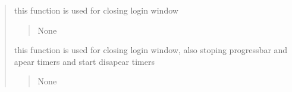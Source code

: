 \documentclass[letterpaper,10pt,english]{sphinxmanual}
\begin{document}
\begin{quote}
\begin{savenotes}
\begin{fulllineitems}
\begin{savenotes}
\begin{fulllineitems}
\end{fulllineitems}\end{savenotes}


\begin{savenotes}\begin{fulllineitems}
\label{\detokenize{setting/notif_UI:oxin.notif_UI.UI_main_window.check_appear_done}}
\pysigstartsignatures
{}
\pysigstopsignatures
\end{fulllineitems}\end{savenotes}


\begin{savenotes}\begin{fulllineitems}
\label{\detokenize{setting/notif_UI:oxin.notif_UI.UI_main_window.close_win}}
\pysigstartsignatures
{}
\pysigstopsignatures
\sphinxAtStartPar
this function is used for closing login window
\begin{quote}\begin{description}
\sphinxAtStartPar
None

\end{description}\end{quote}

\end{fulllineitems}\end{savenotes}


\begin{savenotes}\begin{fulllineitems}
\label{\detokenize{setting/notif_UI:oxin.notif_UI.UI_main_window.close_win_2}}
\pysigstartsignatures
{}
\pysigstopsignatures
\sphinxAtStartPar
this function is used for closing login window, also stoping progressbar and apear timers and start disapear timers
\begin{quote}\begin{description}
\sphinxAtStartPar
None


\end{description}
\end{quote}
\end{fulllineitems}
\end{savenotes}
\end{fulllineitems}
\end{savenotes}
\end{quote}
\end{document}
